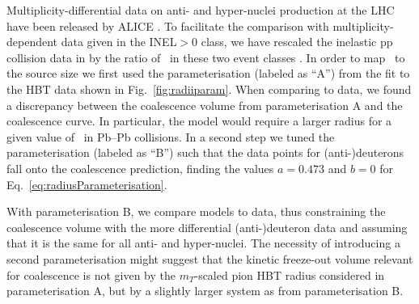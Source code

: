 Multiplicity-differential data on anti- and hyper-nuclei production at the LHC have been released by ALICE \cite{ALICE:nucleipp2017,ALICE:deuteronppPbPb2015,Acharya:2017dmc, Adam:2015yta}. 
To facilitate the comparison with multiplicity-dependent data given in the INEL$>$0 class, we have rescaled the inelastic pp collision data in \cite{ALICE:nucleipp2017} by the ratio of \avdNdeta~in these two event classes \cite{Adam:2015gka}.
In order to map \avdNdeta~to the source size we first used the parameterisation (labeled as ``A'') from the fit to the HBT data shown in Fig.~\ref{fig:radiiparam}. 
When comparing to data, we found a discrepancy between the coalescence volume from parameterisation A and the coalescence curve. 
In particular, the model would require a larger radius for a given value of \btwo~in Pb--Pb collisions.
In a second step we tuned the parameterisation (labeled as ``B'') such that the data points for (anti-)deuterons fall onto the coalescence prediction, finding the values $a = 0.473$ and $b = 0$ for Eq.~\ref{eq:radiusParameterisation}. 

With parameterisation B, we compare models to data, thus constraining the coalescence volume with the more differential (anti-)deuteron data and assuming that it is the same for all anti- and hyper-nuclei. 
The necessity of introducing a second parameterisation might suggest that the kinetic freeze-out volume relevant for coalescence is not given by the $m_{T}$-scaled pion HBT radius considered in parameterisation A, but by a slightly larger system as from parameterisation B.  

